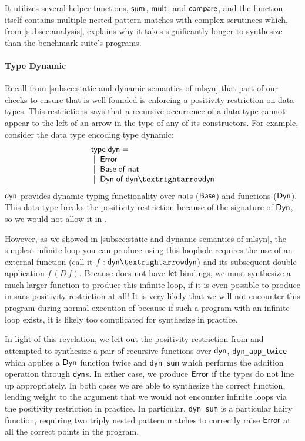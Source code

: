 It utilizes several helper functions, $\mathsf{sum}$, $\mathsf{mult}$, and $\mathsf{compare}$, and the function itself contains multiple nested pattern matches with complex scrutinees which, from \autoref{subsec:analysis}, explains why it takes significantly longer to synthesize than the benchmark suite's programs.

\paragraph{Type Dynamic}

Recall from \autoref{subsec:static-and-dynamic-semantics-of-mlsyn} that part of our checks to ensure that \mlsyn{} is well-founded is enforcing a positivity restriction on data types.
This restrictions says that a recursive occurrence of a data type cannot appear to the left of an arrow in the type of any of its constructors.
For example, consider the data type encoding type dynamic:
\[
  \begin{array}{l}
    \mkwd{type}\;\mdyn = \\
    \bnfalt \mError \\
    \bnfalt \mBase\;\mof\;\mnat \\
    \bnfalt \mDyn\;\mof\;\mdyn → \mdyn
  \end{array}
\]
$\mathsf{dyn}$ provides dynamic typing functionality over $\mathsf{nat}$s ($\mathsf{Base}$) and functions ($\mathsf{Dyn}$).
This data type breaks the positivity restriction because of the signature of $\mathsf{Dyn}$, so we would not allow it in \mlsyn{}.

However, as we showed in \autoref{subsec:static-and-dynamic-semantics-of-mlsyn}, the simplest infinite loop you can produce using this loophole requires the use of an external function (call it $f : \mdyn → \mdyn$) and its subsequent double application $f\,(D\,f)$.
Because \mlsyn{} does not have $\mathsf{let}$-bindings, we must synthesize a much larger function to produce this infinite loop, if it is even possible to produce in \mlsyn{} sans positivity restriction at all!
It is very likely that we will not encounter this program during normal execution of \myth{} because if such a program with an infinite loop exists, it is likely too complicated for \myth{} synthesize in practice.

In light of this revelation, we left out the positivity restriction from \myth{} and attempted to synthesize a pair of recursive functions over $\mathsf{dyn}$, \texttt{dyn\_app\_twice} which applies a $\mathsf{Dyn}$ function twice and \texttt{dyn\_sum} which performs the addition operation through $\mathsf{dyn}$s.
In either case, we produce $\mathsf{Error}$ if the types do not line up appropriately.
In both cases we are able to synthesize the correct function, lending weight to the argument that we would not encounter infinite loops via the positivity restriction in practice.
In particular, \texttt{dyn\_sum} is a particular hairy function, requiring two triply nested pattern matches to correctly raise $\mathsf{Error}$ at all the correct points in the program.

